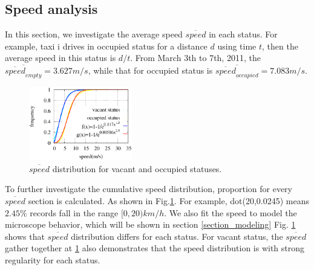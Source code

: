 \subsection{Speed analysis}
In this section, we investigate the average speed $\overline{speed}$ in each status. For example, taxi i drives in occupied status for a distance $d$ using time $t$, then the average speed in this status is $d/t$.
From March 3th to 7th, 2011, the $\overline{\overline{speed}_{empty}} = 3.627 m/s$, while that for occupied status is $\overline{\overline{speed}_{occupied}}=7.083 m/s$.

\begin{figure}[!h]
\centering
\includegraphics[width=0.4\textwidth]{figures_201103/fit/speedfit.eps}
\caption{$\overline{speed}$ distribution for vacant and occupied statuses.}\label{figure_speed_distribution}
\end{figure}

To further investigate the cumulative speed distribution, proportion for every $\overline{speed}$ section is calculated.
As shown in Fig.\ref{figure_speed_distribution}. For example, dot(20,0.0245) means $2.45\%$ records fall in the range $[0,20)km/h$. We also fit the speed to model the microscope behavior, which will be shown in section \ref{section_modeling}
Fig. \ref{figure_speed_distribution} shows that $\overline{speed}$ distribution differs for each status. For vacant status, the $\overline{speed}$ gather together at  \ref{figure_speed_distribution} also demonstrates that the speed distribution is with strong regularity for each status.


